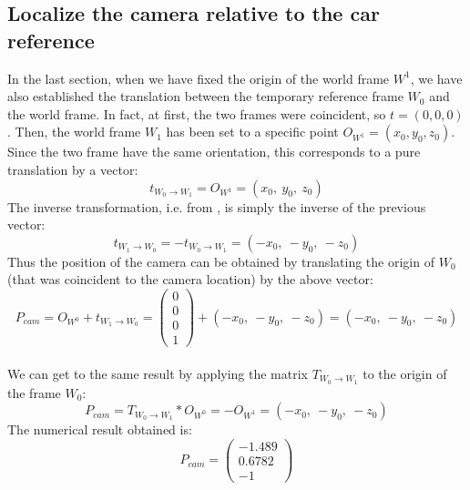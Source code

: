 \documentclass{article}
\begin{document}
\subsection{Localize the camera relative to the car reference}
In the last section, when we have fixed the origin of the world frame $W^1$, we have also established the translation between the temporary reference frame $W_0$ and the world frame. In fact, at first, the two frames were coincident, so $t=(0, 0, 0)$. Then, the world frame $W_1$ has been set to a specific point $O_{W^1}=(x_0, y_0, z_0)$. Since the two frame have the same orientation, this corresponds to a pure translation by a vector:
$$ t_{W_0 \rightarrow W_1} = O_{W^1} = (x_0, \: y_0, \: z_0) $$
The inverse transformation, i.e. from , is simply the inverse of the previous vector:
$$ t_{W_1 \rightarrow W_0} = -t_{W_0 \rightarrow W_1} = (-x_0, \: -y_0, \: -z_0) $$
Thus the position of the camera can be obtained by translating the origin of $W_0$ (that was coincident to the camera location) by the above vector:
$$ P_{cam} = O_{W^0} + t_{W_1 \rightarrow W_0} = \begin{pmatrix}
0 \\ 0 \\ 0 \\ 1
\end{pmatrix} + (-x_0, \: -y_0, \: -z_0) = (-x_0, \: -y_0, \: -z_0) $$
\\
We can get to the same result by applying the matrix $T_{W_0 \rightarrow W_1}$ to the origin of the frame $W_0$:
$$ P_{cam} = T_{W_0 \rightarrow W_1} * O_{W^0} = -O_{W^1} =  (-x_0, \: -y_0, \: -z_0) $$
The numerical result obtained is:
$$ P_{cam} = \begin{pmatrix}
-1.489 \\ 0.6782 \\ -1
\end{pmatrix} $$
\end{document}
